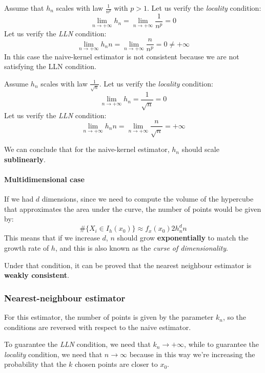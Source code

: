 \begin{exercise}
    Assume that $h_n$ scales with law $\frac{1}{n^p}$ with $p>1$. Let us verify the \textit{locality} condition:
    \[
        \lim_{n \to +\infty} h_n = \lim_{n \to +\infty} \frac{1}{n^p} = 0
    \]
    Let us verify the \textit{LLN} condition:
    \[
        \lim_{n \to +\infty} h_n n = \lim_{n \to +\infty} \frac{n}{n^p} = 0 \neq +\infty
    \]
    In this case the naive-kernel estimator is not consistent because we are not satisfying the LLN condition.
\end{exercise}

\begin{exercise}
    Assume $h_n$ scales with law $\frac{1}{\sqrt{n}}$. Let us verify the \textit{locality} condition:
    \[
        \lim_{n \to +\infty} h_n = \frac{1}{\sqrt{n}} = 0
    \]
    Let us verify the \textit{LLN} condition:
    \[
        \lim_{n \to +\infty} h_n n = \lim_{n \to +\infty} \frac{n}{\sqrt{n}} = +\infty
    \]
\end{exercise}

We can conclude that for the naive-kernel estimator, $h_n$ should scale \textbf{sublinearly}.

\paragraph*{Multidimensional case}
If we had $d$ dimensions, since we need to compute the volume of the hypercube that approximates the area under the curve, the number of points would be given by:
\[
    \#\{X_i \in I_h(x_0)\} \approx f_x(x_0) 2 h^d_n n
\]
This means that if we increase $d$, $n$ should grow \textbf{exponentially} to match the growth rate of $h$, and this is also known as the \textit{curse of dimensionality}.

Under that condition, it can be proved that the nearest neighbour estimator is \textbf{weakly consistent}.
\subsubsection{Nearest-neighbour estimator}
For this estimator, the number of points is given by the parameter $k_n$, so the conditions are reversed with respect to the naive estimator.

To guarantee the \textit{LLN} condition, we need that $k_n \to +\infty$, while to guarantee the \textit{locality} condition, we need that $n \to \infty$ because in this way we're increasing the probability that the $k$ chosen points are closer to $x_0$.

